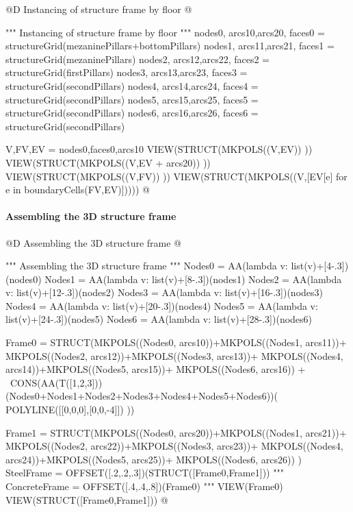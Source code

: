 \documentclass[11pt,oneside]{article}    %
\begin{document}
@D Instancing of structure frame by floor 
@{""" Instancing of structure frame by floor """
nodes0, arcs10,arcs20, faces0 = structureGrid(mezaninePillars+bottomPillars)
nodes1, arcs11,arcs21, faces1 = structureGrid(mezaninePillars)
nodes2, arcs12,arcs22, faces2 = structureGrid(firstPillars)
nodes3, arcs13,arcs23, faces3 = structureGrid(secondPillars)
nodes4, arcs14,arcs24, faces4 = structureGrid(secondPillars)
nodes5, arcs15,arcs25, faces5 = structureGrid(secondPillars)
nodes6, arcs16,arcs26, faces6 = structureGrid(secondPillars)

V,FV,EV = nodes0,faces0,arcs10
VIEW(STRUCT(MKPOLS((V,EV)) ))
VIEW(STRUCT(MKPOLS((V,EV + arcs20)) ))
VIEW(STRUCT(MKPOLS((V,FV)) ))
VIEW(STRUCT(MKPOLS((V,[EV[e] for e in boundaryCells(FV,EV)]))))
@}


\paragraph{Assembling the 3D structure frame}
@D Assembling the 3D structure frame 
@{""" Assembling the 3D structure frame """
Nodes0 = AA(lambda v: list(v)+[4-.3])(nodes0)
Nodes1 = AA(lambda v: list(v)+[8-.3])(nodes1)
Nodes2 = AA(lambda v: list(v)+[12-.3])(nodes2)
Nodes3 = AA(lambda v: list(v)+[16-.3])(nodes3)
Nodes4 = AA(lambda v: list(v)+[20-.3])(nodes4)
Nodes5 = AA(lambda v: list(v)+[24-.3])(nodes5)
Nodes6 = AA(lambda v: list(v)+[28-.3])(nodes6)

Frame0 = STRUCT(MKPOLS((Nodes0, arcs10))+MKPOLS((Nodes1, arcs11))+
    MKPOLS((Nodes2, arcs12))+MKPOLS((Nodes3, arcs13))+
    MKPOLS((Nodes4, arcs14))+MKPOLS((Nodes5, arcs15))+
    MKPOLS((Nodes6, arcs16)) + \
    CONS(AA(T([1,2,3]))(Nodes0+Nodes1+Nodes2+Nodes3+Nodes4+Nodes5+Nodes6))(
    POLYLINE([[0,0,0],[0,0,-4]])  ))

Frame1 = STRUCT(MKPOLS((Nodes0, arcs20))+MKPOLS((Nodes1, arcs21))+
    MKPOLS((Nodes2, arcs22))+MKPOLS((Nodes3, arcs23))+
    MKPOLS((Nodes4, arcs24))+MKPOLS((Nodes5, arcs25))+
    MKPOLS((Nodes6, arcs26)) )
SteelFrame = OFFSET([.2,.2,.3])(STRUCT([Frame0,Frame1]))
"""
ConcreteFrame = OFFSET([.4,.4,.8])(Frame0)
"""
VIEW(Frame0)
VIEW(STRUCT([Frame0,Frame1]))
@}
\end{document}
